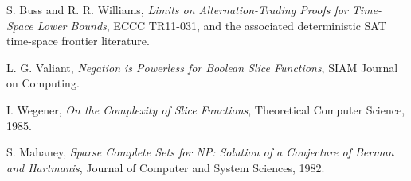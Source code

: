 \documentclass[11pt]{article}
\begin{document}
S. Buss and R. R. Williams, \emph{Limits on Alternation-Trading Proofs for Time-Space Lower Bounds}, ECCC TR11-031, and the associated deterministic SAT time-space frontier literature.

L. G. Valiant, \emph{Negation is Powerless for Boolean Slice Functions}, SIAM Journal on Computing.

I. Wegener, \emph{On the Complexity of Slice Functions}, Theoretical Computer Science, 1985.

S. Mahaney, \emph{Sparse Complete Sets for NP: Solution of a Conjecture of Berman and Hartmanis}, Journal of Computer and System Sciences, 1982.

\end{document}

